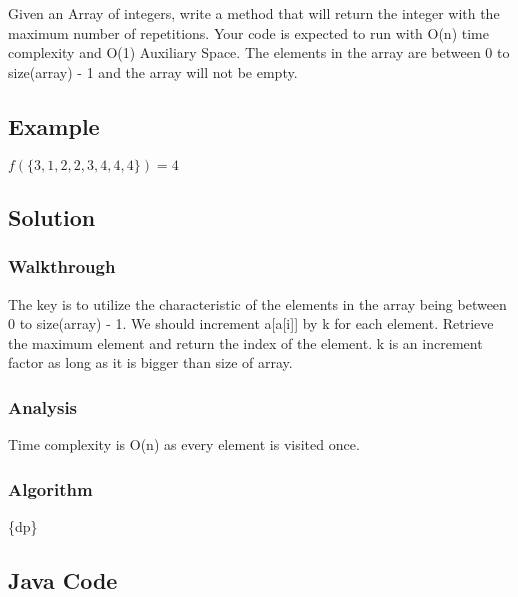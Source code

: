 \documentclass[]{book}
\begin{document}
Given an Array of integers, write a method that will return the integer with the maximum number of repetitions. Your
code is expected to run with O(n) time complexity and O(1) Auxiliary Space. The elements in the array are between 0 to
size(array) - 1 and the array will not be empty.

\hypertarget{example-30}{%
\subsection{Example}\label{example-30}}

\(f(\{3,1,2,2,3,4,4,4\}) = 4\)

\hypertarget{solution-24}{%
\subsection{Solution}\label{solution-24}}

\hypertarget{walkthrough-30}{%
\subsubsection{Walkthrough}\label{walkthrough-30}}

The key is to utilize the characteristic of the elements in the array being between 0 to size(array) - 1. We should
increment a{[}a{[}i{]}{]} by k for each element. Retrieve the maximum element and return the index of the element. k is an
increment factor as long as it is bigger than size of array.

\hypertarget{analysis-33}{%
\subsubsection{Analysis}\label{analysis-33}}

Time complexity is O(n) as every element is visited once.

\hypertarget{algorithm-33}{%
\subsubsection{Algorithm}\label{algorithm-33}}

\{dp\}

\hypertarget{java-code-27}{%
\subsection{Java Code}\label{java-code-27}}
\end{document}

